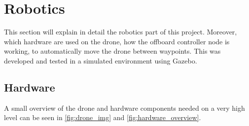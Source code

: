 \documentclass[../Head/Main.tex]{subfiles}
\begin{document}
\section{Robotics}
\label{sub:Robotics}
This section will explain in detail the robotics part of this project. Moreover, which hardware are used on the drone, how the offboard controller node is working, to automatically move the drone between waypoints. This was developed and tested in a simulated environment using Gazebo.

\subsection{Hardware}
\label{subsec:hardware}
A small overview of the drone and hardware components needed on a very high level can be seen in \autoref{fig:drone_img} and \autoref{fig:hardware_overview}.
\end{document}
